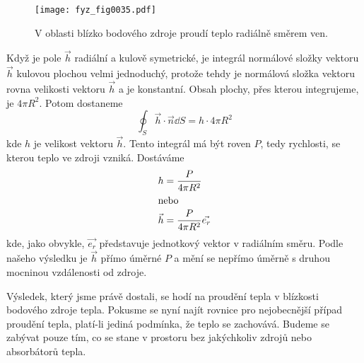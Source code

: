       \begin{figure}[ht!]  %
        \centering
        \texttt{[image: fyz\_fig0035.pdf]}
        \caption{V oblasti blízko bodového zdroje proudí teplo radiálně směrem ven.}
        \label{fyz:fig0035}
      \end{figure}      
      Když je pole \(\vec{h}\) radiální a kulově symetrické, je integrál normálové složky vektoru 
      \(\vec{h}\) kulovou plochou velmi jednoduchý, protože tehdy je normálová složka vektoru rovna 
      velikosti vektoru \(\vec{h}\) a je konstantní. Obsah plochy, přes kterou integrujeme, je 
      \(4\pi R^2\). Potom dostaneme 
      \begin{equation}\label{fyz:eq_gauss6}
       \oint_S\vec{h}\cdot\vec{n}\dd{S} = h\cdot4\pi R^2
      \end{equation}
      kde \(h\) je velikost vektoru \(\vec{h}\). Tento integrál má být roven \(P\), tedy rychlosti, 
      se kterou teplo ve zdroji vzniká. Dostáváme
      \begin{align}
       h       &= \frac{P}{4\pi R^2}                \nonumber                  \\
       \shortintertext{nebo}
       \vec{h} &= \frac{P}{4\pi R^2}\vec{e_r}       \label{fyz:eq_gauss7}
      \end{align} 
      kde, jako obvykle, \(\vec{e_r}\) představuje jednotkový vektor v radiálním směru. Podle 
      našeho výsledku je \(\vec{h}\) přímo úměrné \(P\) a mění se nepřímo úměrně s druhou mocninou 
      vzdálenosti od zdroje.
      
      Výsledek, který jsme právě dostali, se hodí na proudění tepla v blízkosti bodového zdroje 
      tepla. Pokusme se nyní najít rovnice pro nejobecnější případ proudění tepla, platí-li jediná 
      podmínka, že teplo se zachovává. Budeme se zabývat pouze tím, co se stane v prostoru bez 
      jakýchkoliv zdrojů nebo absorbátorů tepla.
      
